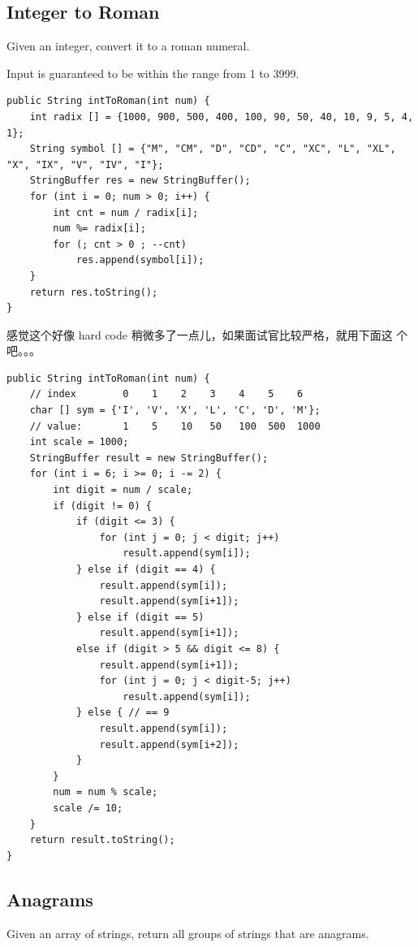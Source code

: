 \documentclass[12pt]{book}
\begin{document}
\subsection{Integer to Roman}
\label{sec-2-2-2}
Given an integer, convert it to a roman numeral.

Input is guaranteed to be within the range from 1 to 3999.

\lstset{language=java,label= ,caption= ,numbers=none}
\begin{lstlisting}
public String intToRoman(int num) {
    int radix [] = {1000, 900, 500, 400, 100, 90, 50, 40, 10, 9, 5, 4, 1};
    String symbol [] = {"M", "CM", "D", "CD", "C", "XC", "L", "XL", "X", "IX", "V", "IV", "I"};
    StringBuffer res = new StringBuffer();
    for (int i = 0; num > 0; i++) {
        int cnt = num / radix[i];
        num %= radix[i];
        for (; cnt > 0 ; --cnt)
            res.append(symbol[i]);
    }
    return res.toString();
}
\end{lstlisting}

感觉这个好像 hard code 稍微多了一点儿，如果面试官比较严格，就用下面这
个吧。。。

\lstset{language=java,label= ,caption= ,numbers=none}
\begin{lstlisting}
public String intToRoman(int num) {
    // index        0    1    2    3    4    5    6
    char [] sym = {'I', 'V', 'X', 'L', 'C', 'D', 'M'};
    // value:       1    5    10   50   100  500  1000
    int scale = 1000;
    StringBuffer result = new StringBuffer();
    for (int i = 6; i >= 0; i -= 2) {
        int digit = num / scale;
        if (digit != 0) {
            if (digit <= 3) {
                for (int j = 0; j < digit; j++) 
                    result.append(sym[i]);    
            } else if (digit == 4) {
                result.append(sym[i]);
                result.append(sym[i+1]);
            } else if (digit == 5)
                result.append(sym[i+1]);
            else if (digit > 5 && digit <= 8) {
                result.append(sym[i+1]);
                for (int j = 0; j < digit-5; j++) 
                    result.append(sym[i]);
            } else { // == 9
                result.append(sym[i]);
                result.append(sym[i+2]);
            }
        }
        num = num % scale;
        scale /= 10;
    }
    return result.toString();
}
\end{lstlisting}

\subsection{Anagrams}
\label{sec-2-2-3}
Given an array of strings, return all groups of strings that are anagrams.
\end{document}

